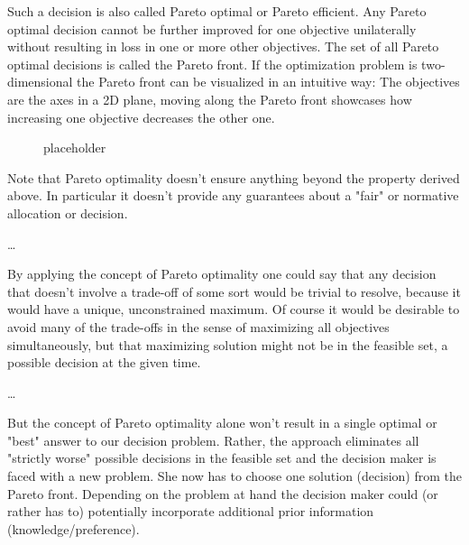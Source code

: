 	Such a decision is also called Pareto optimal or Pareto efficient.
	Any Pareto optimal decision cannot be further improved for one objective unilaterally without resulting in loss in one or more other objectives.
	The set of all Pareto optimal decisions is called the Pareto front.
	If the optimization problem is two-dimensional the Pareto front can be visualized in an intuitive way:
	The objectives are the axes in a 2D plane, moving along the Pareto front showcases how increasing one objective decreases the other one.

	\begin{figure}
	\begin{center}
			
	\caption{placeholder}
	\end{center}
	\end{figure}

	Note that Pareto optimality doesn't ensure anything beyond the property derived above.
	In particular it doesn't provide any guarantees about a "fair" or normative allocation or decision.
	
	\dots

	By applying the concept of Pareto optimality one could say that any decision that doesn't involve a trade-off of some sort would be trivial to resolve, because it would have a unique, unconstrained maximum.
	Of course it would be desirable to avoid many of the trade-offs in the sense of maximizing all objectives simultaneously, but that maximizing solution might not be in the feasible set, \ie a possible decision at the given time.

	\dots

	But the concept of Pareto optimality alone won't result in a single optimal or "best" answer to our decision problem.
	Rather, the approach eliminates all "strictly worse" possible decisions in the feasible set and the decision maker is faced with a new problem.
	She now has to choose one solution (decision) from the Pareto front.
	Depending on the problem at hand the decision maker could (or rather has to) potentially incorporate additional prior information (knowledge/preference).

